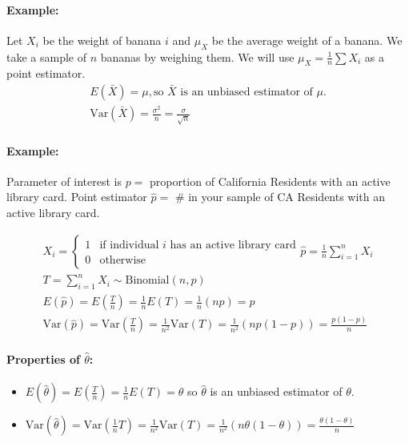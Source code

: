 \paragraph*{Example:}
Let $X_i$ be the weight of banana $i$ and $\mu_X$ be the average weight of a banana. We take a sample of $n$ bananas by weighing them.
We will use $\mu_X = \frac{1}{n} \sum X_i$ as a point estimator.
\begin{align*}
    E(\bar{X}) = \mu, \text{so } \bar{X} \text{ is an unbiased estimator of } \mu. \\
    \text{Var}(\bar{X}) = \frac{\sigma^2}{n} = \frac{\sigma}{\sqrt{n}}
\end{align*}

\paragraph*{Example:}
Parameter of interest is $p =$ proportion of California Residents with an active library card. Point estimator $\hat{p} =$ \# in your sample of CA Residents
with an active library card.

\begin{align*}
    X_i = \begin{cases}
        1 & \text{if individual } i \text{ has an active library card} \\
        0 & \text{otherwise}
    \end{cases}
    \hat{p} = \frac{1}{n} \sum_{i=1}^n X_i\\
    T = \sum_{i=1}^n X_i \sim \text{Binomial}(n, p)\\
    E(\hat{p}) = E\left(\frac{T}{n}\right) = \frac{1}{n} E(T) = \frac{1}{n} (n p) = p \\
    \text{Var}(\hat{p}) = \text{Var}\left(\frac{T}{n}\right) = \frac{1}{n^2} \text{Var}(T) = \frac{1}{n^2} (n p (1 - p)) = \frac{p(1 - p)}{n}
\end{align*}

\paragraph*{Properties of $\hat{\theta}$:}
\begin{itemize}
    \item $E(\hat{\theta}) = E(\frac{T}{n}) = \frac{1}{n} E(T) = \theta$ so $\hat{\theta}$ is an unbiased estimator of $\theta$.
    \item $\text{Var}(\hat{\theta}) = \text{Var}(\frac{1}{n} T) = \frac{1}{n^2} \text{Var}(T) = \frac{1}{n^2} (n \theta (1 - \theta)) = \frac{\theta (1 - \theta)}{n}$
\end{itemize}

